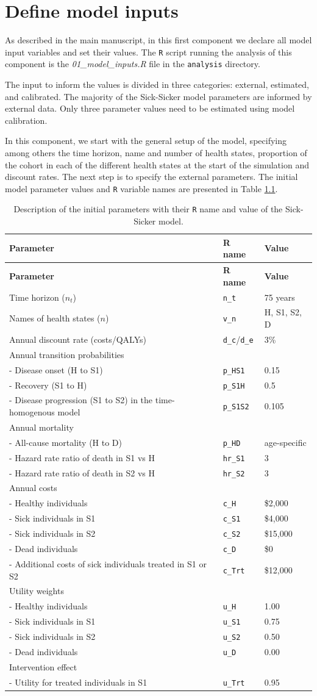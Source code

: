 \documentclass[]{book}
\begin{document}
\chapter{Define model inputs}\label{inputs}

As described in the main manuscript, in this first component we declare
all model input variables and set their values. The \texttt{R} script
running the analysis of this component is the \emph{01\_model\_inputs.R}
file in the \texttt{analysis} directory.

The input to inform the values is divided in three categories: external,
estimated, and calibrated. The majority of the Sick-Sicker model
parameters are informed by external data. Only three parameter values
need to be estimated using model calibration.

In this component, we start with the general setup of the model,
specifying among others the time horizon, name and number of health
states, proportion of the cohort in each of the different health states
at the start of the simulation and discount rates. The next step is to
specify the external parameters. The initial model parameter values and
\texttt{R} variable names are presented in Table \ref{tab:parameters}.

\begin{longtable}[]{@{}lll@{}}
\caption{\label{tab:parameters} Description of the initial parameters with
their \texttt{R} name and value of the Sick-Sicker
model.}\tabularnewline
\toprule
\textbf{Parameter} & \textbf{R name} & \textbf{Value}\tabularnewline
\midrule
\endfirsthead
\toprule
\textbf{Parameter} & \textbf{R name} & \textbf{Value}\tabularnewline
\midrule
\endhead
Time horizon (\(n_t\)) & \texttt{n\_t} & 75 years\tabularnewline
Names of health states (\(n\)) & \texttt{v\_n} & H, S1, S2,
D\tabularnewline
Annual discount rate (costs/QALYs) & \texttt{d\_c}/\texttt{d\_e} &
3\%\tabularnewline
Annual transition probabilities & &\tabularnewline
- Disease onset (H to S1) & \texttt{p\_HS1} & 0.15\tabularnewline
- Recovery (S1 to H) & \texttt{p\_S1H} & 0.5\tabularnewline
- Disease progression (S1 to S2) in the time-homogenous model &
\texttt{p\_S1S2} & 0.105\tabularnewline
Annual mortality & &\tabularnewline
- All-cause mortality (H to D) & \texttt{p\_HD} &
age-specific\tabularnewline
- Hazard rate ratio of death in S1 vs H & \texttt{hr\_S1} &
3\tabularnewline
- Hazard rate ratio of death in S2 vs H & \texttt{hr\_S2} &
3\tabularnewline
Annual costs & &\tabularnewline
- Healthy individuals & \texttt{c\_H} & \$2,000\tabularnewline
- Sick individuals in S1 & \texttt{c\_S1} & \$4,000\tabularnewline
- Sick individuals in S2 & \texttt{c\_S2} & \$15,000\tabularnewline
- Dead individuals & \texttt{c\_D} & \$0\tabularnewline
- Additional costs of sick individuals treated in S1 or S2 &
\texttt{c\_Trt} & \$12,000\tabularnewline
Utility weights & &\tabularnewline
- Healthy individuals & \texttt{u\_H} & 1.00\tabularnewline
- Sick individuals in S1 & \texttt{u\_S1} & 0.75\tabularnewline
- Sick individuals in S2 & \texttt{u\_S2} & 0.50\tabularnewline
- Dead individuals & \texttt{u\_D} & 0.00\tabularnewline
Intervention effect & &\tabularnewline
- Utility for treated individuals in S1 & \texttt{u\_Trt} &
0.95\tabularnewline
\bottomrule
\end{longtable}
\end{document}

